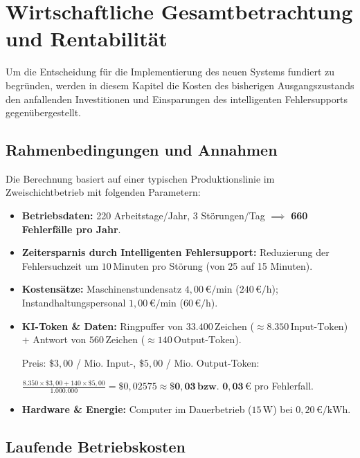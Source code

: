 

\section{Wirtschaftliche Gesamtbetrachtung und Rentabilität}

Um die Entscheidung für die Implementierung des neuen Systems fundiert zu begründen, werden in diesem Kapitel die Kosten des bisherigen Ausgangszustands den anfallenden Investitionen und Einsparungen des intelligenten Fehlersupports gegenübergestellt.

\subsection{Rahmenbedingungen und Annahmen}

Die Berechnung basiert auf einer typischen Produktionslinie im Zweischichtbetrieb mit folgenden Parametern:
\begin{itemize}
    \item \textbf{Betriebsdaten:} 220 Arbeitstage/Jahr, 3 Störungen/Tag $\implies$ \textbf{660 Fehlerfälle pro Jahr}.
    \item \textbf{Zeitersparnis durch Intelligenten Fehlersupport:} Reduzierung der Fehlersuchzeit um $10\,\text{Minuten}$ pro Störung (von 25 auf 15 Minuten).
    \item \textbf{Kostensätze:} Maschinenstundensatz $4{,}00\,\text{€/min}$ ($240\,\text{€/h}$); Instandhaltungspersonal $1{,}00\,\text{€/min}$ ($60\,\text{€/h}$).
    \item \textbf{KI-Token \& Daten:} Ringpuffer von $33.400\,\text{Zeichen}$ ($\approx 8.350\,\text{Input-Token}$) + Antwort von $560\,\text{Zeichen}$ ($\approx 140\,\text{Output-Token}$). 
    
    Preis: $\$3{,}00$ / Mio. Input-, $\$5{,}00$ / Mio. Output-Token:
    
    $\frac{8.350 \times \$3{,}00 + 140 \times \$5{,}00}{1.000.000} = \$0{,}02575 \approx \mathbf{\$0{,}03\,\text{bzw. } 0{,}03\,\text{€}}$ pro Fehlerfall.




    \item \textbf{Hardware \& Energie:} Computer im Dauerbetrieb ($15\,\text{W}$) bei $0{,}20\,\text{€/kWh}$.
\end{itemize}

\subsection{Laufende Betriebskosten}

